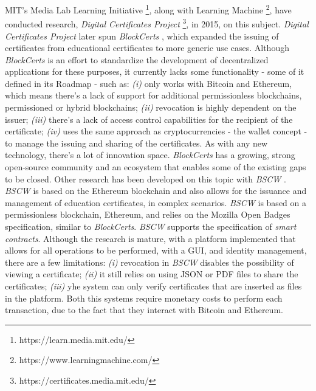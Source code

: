 MIT's Media Lab Learning Initiative \footnote{https://learn.media.mit.edu/}, along with Learning Machine \footnote{https://www.learningmachine.com/}, have conducted research, \textit{Digital Certificates Project} \footnote{https://certificates.media.mit.edu/}, in 2015, on this subject. \textit{Digital Certificates Project} later spun \textit{BlockCerts} \cite{Blockcerts}, which expanded the issuing of certificates from educational certificates to more generic use cases. Although \textit{BlockCerts} is an effort to standardize the development of decentralized applications for these purposes, it currently lacks some functionality - some of it defined in its Roadmap - such as: \emph{(i)} only works with Bitcoin and Ethereum, which means there's a lack of support for additional permissionless blockchains, permissioned or hybrid blockchains; \emph{(ii)} revocation is highly dependent on the issuer; \emph{(iii)} there's a lack of access control capabilities for the recipient of the certificate; \emph{(iv)} uses the same approach as cryptocurrencies - the wallet concept - to manage the issuing and sharing of the certificates. As with any new technology, there's a lot of innovation space. \textit{BlockCerts} has a growing, strong open-source community and an ecosystem that enables some of the existing gaps to be closed. Other research has been developed on this topic with \emph{BSCW} \cite{grather_blockchain_2018}. \emph{BSCW} is based on the Ethereum blockchain and also allows for the issuance and management of education certificates, in complex scenarios. \emph{BSCW} is based on a permissionless blockchain, Ethereum, and relies on the Mozilla Open Badges specification, similar to \emph{BlockCerts}. \emph{BSCW} supports the specification of \emph{smart contracts}. Although the research is mature, with a platform implemented that allows for all operations to be performed, with a GUI, and identity management, there are a few limitations: \emph{(i)} revocation in \emph{BSCW} disables the possibility of viewing a certificate; \emph{(ii)} it still relies on using JSON or PDF files to share the certificates; \emph{(iii)} yhe system can only verify certificates that are inserted as files in the platform. Both this systems require monetary costs to perform each transaction, due to the fact that they interact with Bitcoin and Ethereum.